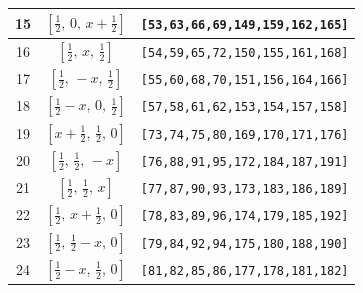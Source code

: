 \documentclass[fleqn,8pt]{jsarticle}
\begin{document}
\begin{longtable}{ccc}
15 & $\left[ \frac{1}{2},\, 0,\, x + \frac{1}{2} \right]$ & {\tt [53,63,66,69,149,159,162,165]} \\ \hline
16 & $\left[ \frac{1}{2},\, x,\, \frac{1}{2} \right]$ & {\tt [54,59,65,72,150,155,161,168]} \\ \hline
17 & $\left[ \frac{1}{2},\, - x,\, \frac{1}{2} \right]$ & {\tt [55,60,68,70,151,156,164,166]} \\ \hline
18 & $\left[ \frac{1}{2} - x,\, 0,\, \frac{1}{2} \right]$ & {\tt [57,58,61,62,153,154,157,158]} \\ \hline
19 & $\left[ x + \frac{1}{2},\, \frac{1}{2},\, 0 \right]$ & {\tt [73,74,75,80,169,170,171,176]} \\ \hline
20 & $\left[ \frac{1}{2},\, \frac{1}{2},\, - x \right]$ & {\tt [76,88,91,95,172,184,187,191]} \\ \hline
21 & $\left[ \frac{1}{2},\, \frac{1}{2},\, x \right]$ & {\tt [77,87,90,93,173,183,186,189]} \\ \hline
22 & $\left[ \frac{1}{2},\, x + \frac{1}{2},\, 0 \right]$ & {\tt [78,83,89,96,174,179,185,192]} \\ \hline
23 & $\left[ \frac{1}{2},\, \frac{1}{2} - x,\, 0 \right]$ & {\tt [79,84,92,94,175,180,188,190]} \\ \hline
24 & $\left[ \frac{1}{2} - x,\, \frac{1}{2},\, 0 \right]$ & {\tt [81,82,85,86,177,178,181,182]} \\
\end{longtable}
\renewcommand{\arraystretch}{1.2}
\end{document}
